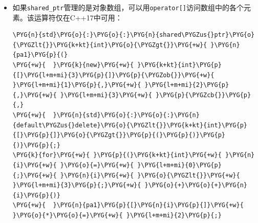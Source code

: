 \begin{itemize}
\begin{codeblockbg}
\begin{Verbatim}[commandchars=\\\{\},breaklines=true,breakanywhere=true,fontsize=\codefont,xleftmargin=17bp]
\PYG{n}{std}\PYG{o}{:}\PYG{o}{:}\PYG{n}{shared\PYGZus{}ptr}\PYG{o}{\PYGZlt{}}\PYG{k+kt}{int}\PYG{o}{\PYGZgt{}}\PYG{+w}{ }\PYG{n}{pi}\PYG{+w}{ }\PYG{o}{=}\PYG{+w}{ }\PYG{n}{std}\PYG{o}{:}\PYG{o}{:}\PYG{n}{make\PYGZus{}shared}\PYG{o}{\PYGZlt{}}\PYG{k+kt}{int}\PYG{o}{\PYGZgt{}}\PYG{p}{(}\PYG{l+m+mi}{42}\PYG{p}{)}\PYG{p}{;}
\PYG{o}{*}\PYG{n}{pi}\PYG{+w}{ }\PYG{o}{=}\PYG{+w}{ }\PYG{l+m+mi}{21}\PYG{p}{;}
\PYG{n}{std}\PYG{o}{:}\PYG{o}{:}\PYG{n}{shared\PYGZus{}ptr}\PYG{o}{\PYGZlt{}}\PYG{n}{foo}\PYG{o}{\PYGZgt{}}\PYG{+w}{ }\PYG{n}{pf}\PYG{+w}{ }\PYG{o}{=}\PYG{+w}{ }\PYG{n}{std}\PYG{o}{:}\PYG{o}{:}\PYG{n}{make\PYGZus{}shared}\PYG{o}{\PYGZlt{}}\PYG{n}{foo}\PYG{o}{\PYGZgt{}}\PYG{p}{(}\PYG{l+m+mi}{42}\PYG{p}{,}\PYG{+w}{ }\PYG{l+m+mf}{42.0}\PYG{p}{,}\PYG{+w}{ }\PYG{l+s}{\PYGZdq{}}\PYG{l+s}{42}\PYG{l+s}{\PYGZdq{}}\PYG{p}{)}\PYG{p}{;}
\PYG{n}{pf}\PYG{o}{\PYGZhy{}}\PYG{o}{\PYGZgt{}}\PYG{n}{print}\PYG{p}{(}\PYG{p}{)}\PYG{p}{;}
\end{Verbatim}
\end{codeblockbg}



\item 如果\texttt{shared\_\allowbreak{}ptr}管理的是对象数组，可以用\texttt{operator[]}访问数组中的各个元素。该运算符仅在C++17中可用：



\begin{codeblockbg}
\begin{Verbatim}[commandchars=\\\{\},breaklines=true,breakanywhere=true,fontsize=\codefont,xleftmargin=17bp]
\PYG{n}{std}\PYG{o}{:}\PYG{o}{:}\PYG{n}{shared\PYGZus{}ptr}\PYG{o}{\PYGZlt{}}\PYG{k+kt}{int}\PYG{o}{\PYGZgt{}}\PYG{+w}{ }\PYG{n}{pa1}\PYG{p}{(}
\PYG{+w}{  }\PYG{k}{new}\PYG{+w}{ }\PYG{k+kt}{int}\PYG{p}{[}\PYG{l+m+mi}{3}\PYG{p}{]}\PYG{p}{\PYGZob{}}\PYG{+w}{ }\PYG{l+m+mi}{1}\PYG{p}{,}\PYG{+w}{ }\PYG{l+m+mi}{2}\PYG{p}{,}\PYG{+w}{ }\PYG{l+m+mi}{3}\PYG{+w}{ }\PYG{p}{\PYGZcb{}}\PYG{p}{,}
\PYG{+w}{  }\PYG{n}{std}\PYG{o}{:}\PYG{o}{:}\PYG{n}{default\PYGZus{}delete}\PYG{o}{\PYGZlt{}}\PYG{k+kt}{int}\PYG{p}{[}\PYG{p}{]}\PYG{o}{\PYGZgt{}}\PYG{p}{(}\PYG{p}{)}\PYG{p}{)}\PYG{p}{;}
\PYG{k}{for}\PYG{+w}{ }\PYG{p}{(}\PYG{k+kt}{int}\PYG{+w}{ }\PYG{n}{i}\PYG{+w}{ }\PYG{o}{=}\PYG{+w}{ }\PYG{l+m+mi}{0}\PYG{p}{;}\PYG{+w}{ }\PYG{n}{i}\PYG{+w}{ }\PYG{o}{\PYGZlt{}}\PYG{+w}{ }\PYG{l+m+mi}{3}\PYG{p}{;}\PYG{+w}{ }\PYG{o}{+}\PYG{o}{+}\PYG{n}{i}\PYG{p}{)}
\PYG{+w}{  }\PYG{n}{pa1}\PYG{p}{[}\PYG{n}{i}\PYG{p}{]}\PYG{+w}{ }\PYG{o}{*}\PYG{o}{=}\PYG{+w}{ }\PYG{l+m+mi}{2}\PYG{p}{;}
\end{Verbatim}
\end{codeblockbg}



\end{itemize}
